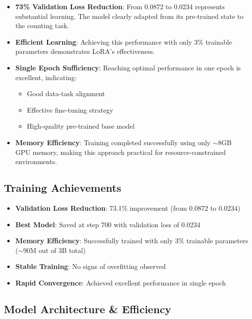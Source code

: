 \documentclass[conference]{IEEEtran}
\begin{document}
\begin{itemize}
    \item \textbf{73\% Validation Loss Reduction}: From 0.0872 to 0.0234 represents substantial learning. The model clearly adapted from its pre-trained state to the counting task.
    
    \item \textbf{Efficient Learning}: Achieving this performance with only 3\% trainable parameters demonstrates LoRA's effectiveness.
    
    \item \textbf{Single Epoch Sufficiency}: Reaching optimal performance in one epoch is excellent, indicating:
    \begin{itemize}
        \item Good data-task alignment
        \item Effective fine-tuning strategy
        \item High-quality pre-trained base model
    \end{itemize}
    
    \item \textbf{Memory Efficiency}: Training completed successfully using only $\sim$8GB GPU memory, making this approach practical for resource-constrained environments.
\end{itemize}

\subsection{Training Achievements}

\begin{itemize}
    \item \textbf{Validation Loss Reduction}: 73.1\% improvement (from 0.0872 to 0.0234)
    \item \textbf{Best Model}: Saved at step 700 with validation loss of 0.0234
    \item \textbf{Memory Efficiency}: Successfully trained with only 3\% trainable parameters ($\sim$90M out of 3B total)
    \item \textbf{Stable Training}: No signs of overfitting observed
    \item \textbf{Rapid Convergence}: Achieved excellent performance in single epoch
\end{itemize}

\subsection{Model Architecture \& Efficiency}
\end{document}
